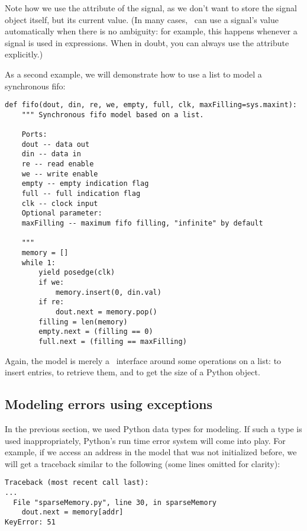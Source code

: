 Note how we use the  attribute of the  signal, as
we don't want to store the signal object itself, but its current
value. (In many cases, \myhdl\ can use a signal's value automatically
when there is no ambiguity: for example, this happens whenever a
signal is used in expressions. When in doubt, you can always use the
 attribute explicitly.)

As a second example, we will demonstrate how to use a list to model a
synchronous fifo:

\begin{verbatim}
def fifo(dout, din, re, we, empty, full, clk, maxFilling=sys.maxint):
    """ Synchronous fifo model based on a list.

    Ports:
    dout -- data out
    din -- data in
    re -- read enable
    we -- write enable
    empty -- empty indication flag
    full -- full indication flag
    clk -- clock input
    Optional parameter:
    maxFilling -- maximum fifo filling, "infinite" by default

    """
    memory = []
    while 1:
        yield posedge(clk)
        if we:
            memory.insert(0, din.val)
        if re:
            dout.next = memory.pop()
        filling = len(memory)
        empty.next = (filling == 0)
        full.next = (filling == maxFilling)
\end{verbatim}

Again, the model is merely a \myhdl\ interface around some operations
on a list:  to insert entries,  to
retrieve them, and  to get the size of a Python
object.

\subsection{Modeling errors using exceptions \label{model-err}}

In the previous section, we used Python data types for modeling. If
such a type is used inappropriately, Python's run time error system
will come into play. For example, if we access an address in the
 model that was not initialized before, we will
get a traceback similar to the following (some lines omitted for
clarity):

\begin{verbatim}
Traceback (most recent call last):
...
  File "sparseMemory.py", line 30, in sparseMemory
    dout.next = memory[addr]
KeyError: 51
\end{verbatim}

